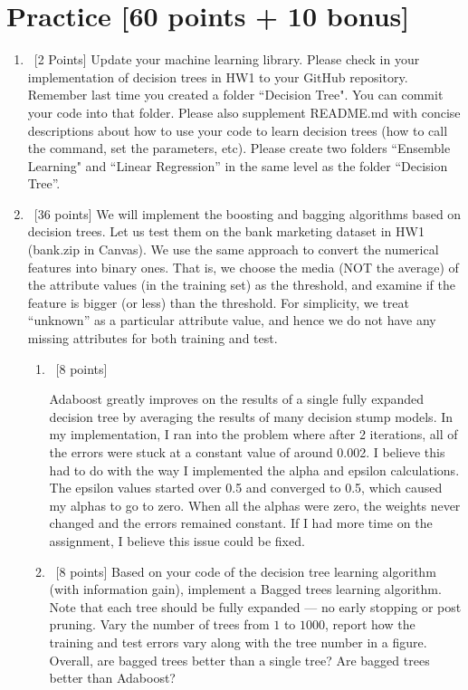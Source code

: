 \documentclass[12pt, fullpage,letterpaper]{article}
\begin{document}
\section{Practice [60 points + 10 bonus]}
\begin{enumerate}
	\item~[2 Points] Update your machine learning library. Please check in your implementation of decision trees in HW1 to your GitHub repository. Remember last time you created a folder ``Decision Tree". You can commit your code into that folder. Please also supplement README.md with concise descriptions about how to use your code to learn decision trees (how to call the command, set the parameters, etc). Please create two folders ``Ensemble Learning" and ``Linear Regression''  in the same level as the folder ``Decision Tree''.  


\item~[36 points] We will implement the boosting and bagging algorithms based on decision trees.  Let us test them on the bank marketing dataset in HW1 (bank.zip in Canvas). We use the same approach to convert the numerical features into binary ones. That is, we choose the media (NOT the average) of the attribute values (in the training set) as the threshold, and examine if the feature is bigger (or less) than the threshold.  For simplicity, we treat ``unknown'' as a particular attribute value, and hence we do not have any missing attributes for both training and test.
\begin{enumerate}
	\item~[8 points] 
	
	
	Adaboost greatly improves on the results of a single fully expanded decision tree by averaging the results of many decision stump models. In my implementation, I ran into the problem where after 2 iterations, all of the errors were stuck at a constant value of around 0.002. I believe this had to do with the way I implemented the alpha and epsilon calculations. The epsilon values started over 0.5 and converged to 0.5, which caused my alphas to go to zero. When all the alphas were zero, the weights never changed and the errors remained constant. If I had more time on the assignment, I believe this issue could be fixed.
	
	\item~[8 points] Based on your code of the decision tree learning algorithm (with information gain), implement a Bagged trees learning algorithm. Note that each tree should be fully expanded --- no early stopping or post pruning. Vary the number of trees from $1$ to $1000$, report how the training and test errors vary along with the tree number in a figure. Overall, are bagged trees better than a single tree? Are bagged trees better than Adaboost? 
	

\end{enumerate}
\end{enumerate}
\end{document}
